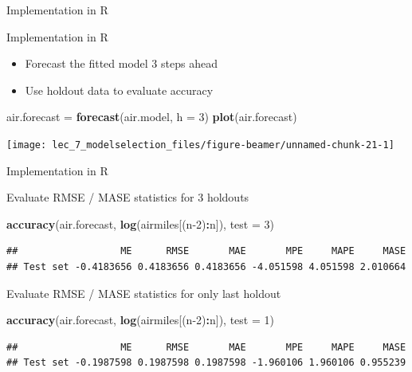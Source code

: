 \documentclass[ignorenonframetext,]{beamer}
\newenvironment{Shaded}{\begin{snugshade}}{\end{snugshade}}
\newcommand{\DataTypeTok}[1]{\textcolor[rgb]{0.13,0.29,0.53}{#1}}
\newcommand{\DecValTok}[1]{\textcolor[rgb]{0.00,0.00,0.81}{#1}}
\newcommand{\KeywordTok}[1]{\textcolor[rgb]{0.13,0.29,0.53}{\textbf{#1}}}
\newcommand{\NormalTok}[1]{#1}
\newcommand{\OperatorTok}[1]{\textcolor[rgb]{0.81,0.36,0.00}{\textbf{#1}}}
\newcommand{\StringTok}[1]{\textcolor[rgb]{0.31,0.60,0.02}{#1}}
\providecommand{\tightlist}{%
  \setlength{\itemsep}{0pt}\setlength{\parskip}{0pt}}
\begin{document}
\begin{frame}[fragile]
\begin{block}{Implementation in R}
\end{block}

\begin{block}{Implementation in R}

\begin{itemize}
\tightlist
\item
  Forecast the fitted model 3 steps ahead
\item
  Use holdout data to evaluate accuracy
\end{itemize}

\begin{Shaded}
\begin{Highlighting}[]
\NormalTok{air.forecast =}\StringTok{ }\KeywordTok{forecast}\NormalTok{(air.model, }\DataTypeTok{h =} \DecValTok{3}\NormalTok{)}
\KeywordTok{plot}\NormalTok{(air.forecast)}
\end{Highlighting}
\end{Shaded}

\begin{center}\texttt{[image: lec\_7\_modelselection\_files/figure-beamer/unnamed-chunk-21-1]} \end{center}

\end{block}

\begin{block}{Implementation in R}

Evaluate RMSE / MASE statistics for 3 holdouts

\begin{Shaded}
\begin{Highlighting}[]
\KeywordTok{accuracy}\NormalTok{(air.forecast, }\KeywordTok{log}\NormalTok{(airmiles[(n}\DecValTok{-2}\NormalTok{)}\OperatorTok{:}\NormalTok{n]), }\DataTypeTok{test =} \DecValTok{3}\NormalTok{)}
\end{Highlighting}
\end{Shaded}

\begin{verbatim}
##                  ME      RMSE       MAE       MPE     MAPE     MASE
## Test set -0.4183656 0.4183656 0.4183656 -4.051598 4.051598 2.010664
\end{verbatim}

Evaluate RMSE / MASE statistics for only last holdout

\begin{Shaded}
\begin{Highlighting}[]
\KeywordTok{accuracy}\NormalTok{(air.forecast, }\KeywordTok{log}\NormalTok{(airmiles[(n}\DecValTok{-2}\NormalTok{)}\OperatorTok{:}\NormalTok{n]), }\DataTypeTok{test =} \DecValTok{1}\NormalTok{)}
\end{Highlighting}
\end{Shaded}

\begin{verbatim}
##                  ME      RMSE       MAE       MPE     MAPE     MASE
## Test set -0.1987598 0.1987598 0.1987598 -1.960106 1.960106 0.955239
\end{verbatim}

\end{block}

\end{frame}
\end{document}
